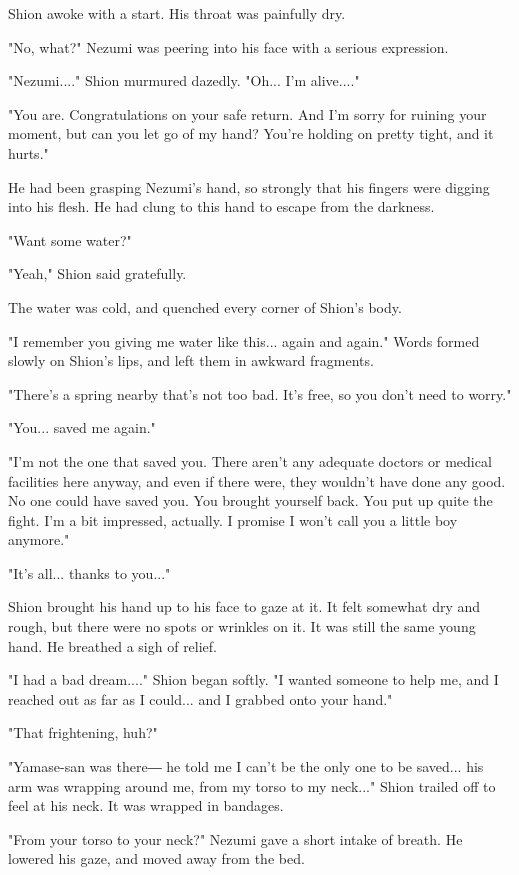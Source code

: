 Shion awoke with a start. His throat was painfully dry.

"No, what?" Nezumi was peering into his face with a serious expression.

"Nezumi...." Shion murmured dazedly. "Oh... I'm alive...."

"You are. Congratulations on your safe return. And I'm sorry for ruining
your moment, but can you let go of my hand? You're holding on pretty
tight, and it hurts."

He had been grasping Nezumi's hand, so strongly that his fingers were
digging into his flesh. He had clung to this hand to escape from the
darkness.

"Want some water?"

"Yeah," Shion said gratefully.

The water was cold, and quenched every corner of Shion's body.

"I remember you giving me water like this... again and again." Words
formed slowly on Shion's lips, and left them in awkward fragments.

"There's a spring nearby that's not too bad. It's free, so you don't
need to worry."

"You... saved me again."

"I'm not the one that saved you. There aren't any adequate doctors or
medical facilities here anyway, and even if there were, they wouldn't
have done any good. No one could have saved you. You brought yourself
back. You put up quite the fight. I'm a bit impressed, actually. I
promise I won't call you a little boy anymore."

"It's all... thanks to you..."

Shion brought his hand up to his face to gaze at it. It felt somewhat
dry and rough, but there were no spots or wrinkles on it. It was still
the same young hand. He breathed a sigh of relief.

"I had a bad dream...." Shion began softly. "I wanted someone to help
me, and I reached out as far as I could... and I grabbed onto your
hand."

"That frightening, huh?"

"Yamase-san was there― he told me I can't be the only one to be saved...
his arm was wrapping around me, from my torso to my neck..." Shion
trailed off to feel at his neck. It was wrapped in bandages.

"From your torso to your neck?" Nezumi gave a short intake of breath. He
lowered his gaze, and moved away from the bed.

